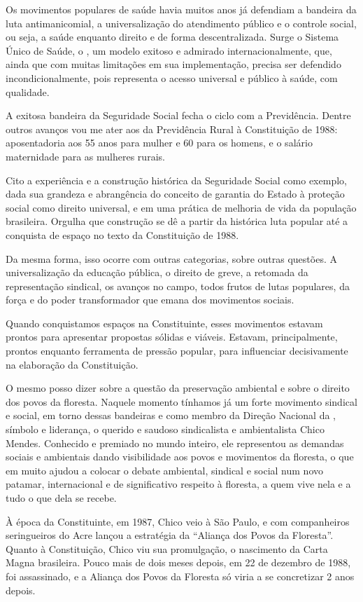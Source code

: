 Os movimentos populares de saúde havia muitos anos já defendiam a
bandeira da luta antimanicomial, a universalização do atendimento
público e o controle social, ou seja, a saúde enquanto direito e de
forma descentralizada. Surge o Sistema Único de Saúde, o , um
modelo exitoso e admirado internacionalmente, que, ainda que com muitas
limitações em sua implementação, precisa ser defendido
incondicionalmente, pois representa o acesso universal e público à
saúde, com qualidade.

A exitosa bandeira da Seguridade Social fecha o ciclo com a Previdência.
Dentre outros avanços vou me ater aos da Previdência Rural à
Constituição de 1988: aposentadoria aos 55 anos para mulher e 60 para os
homens, e o salário maternidade para as mulheres rurais.

Cito a experiência e a construção histórica da Seguridade Social como
exemplo, dada sua grandeza e abrangência do conceito de garantia do
Estado à proteção social como direito universal, e em uma prática de
melhoria de vida da população brasileira. Orgulha que construção se
dê a partir da histórica luta popular até a conquista de espaço no
texto da Constituição de 1988.

Da mesma forma, isso ocorre com outras categorias, sobre outras questões. A
universalização da educação pública, o direito de greve, a retomada da
representação sindical, os avanços no campo, todos frutos de lutas populares,
da força e do poder transformador que emana dos movimentos sociais.

Quando conquistamos espaços na Constituinte, esses movimentos estavam
prontos para apresentar propostas sólidas e viáveis. Estavam,
principalmente, prontos enquanto ferramenta de pressão popular, para
influenciar decisivamente na elaboração da Constituição.

O mesmo posso dizer sobre a questão da preservação ambiental e sobre o
direito dos povos da floresta. Naquele momento tínhamos já um forte
movimento sindical e social, em torno dessas bandeiras e como membro da
Direção Nacional da , símbolo e liderança, o querido e saudoso
sindicalista e ambientalista Chico Mendes. Conhecido e premiado no mundo
inteiro, ele representou as demandas sociais e ambientais dando
visibilidade aos povos e movimentos da floresta, o que em muito ajudou a
colocar o debate ambiental, sindical e social num novo patamar,
internacional e de significativo respeito à floresta, a quem vive nela e
a tudo o que dela se recebe.

À época da Constituinte, em 1987, Chico veio à São Paulo, e com
companheiros seringueiros do Acre lançou a estratégia da ``Aliança dos
Povos da Floresta''. Quanto à Constituição, Chico viu sua promulgação, o
nascimento da Carta Magna brasileira. Pouco mais de dois meses depois,
em 22 de dezembro de 1988, foi assassinado, e a Aliança dos Povos da
Floresta só viria a se concretizar 2 anos depois.

